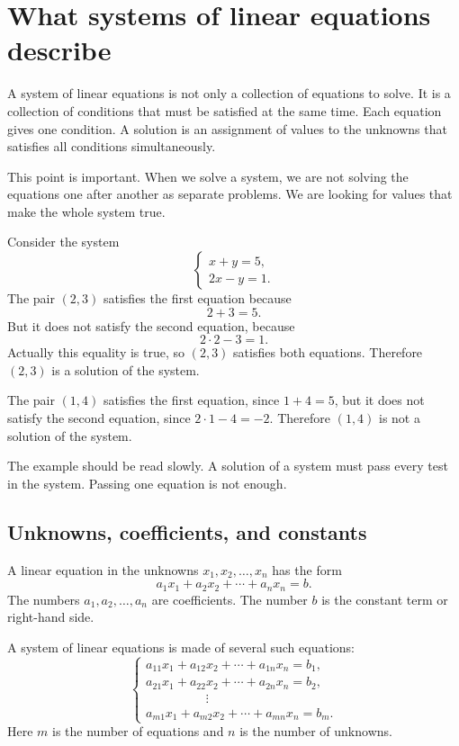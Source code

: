 \section{What systems of linear equations describe}

A system of linear equations is not only a collection of equations to solve. It is a collection of conditions that must be satisfied at the same time. Each equation gives one condition. A solution is an assignment of values to the unknowns that satisfies all conditions simultaneously.

This point is important. When we solve a system, we are not solving the equations one after another as separate problems. We are looking for values that make the whole system true.

\begin{examplebox}
Consider the system
\[
\begin{cases}
x+y=5,\\
2x-y=1.
\end{cases}
\]
The pair \((2,3)\) satisfies the first equation because
\[
2+3=5.
\]
But it does not satisfy the second equation, because
\[
2\cdot2-3=1.
\]
Actually this equality is true, so \((2,3)\) satisfies both equations. Therefore \((2,3)\) is a solution of the system.

The pair \((1,4)\) satisfies the first equation, since \(1+4=5\), but it does not satisfy the second equation, since \(2\cdot1-4=-2\). Therefore \((1,4)\) is not a solution of the system.
\end{examplebox}

The example should be read slowly. A solution of a system must pass every test in the system. Passing one equation is not enough.

\subsection*{Unknowns, coefficients, and constants}

A linear equation in the unknowns \(x_1,x_2,\ldots,x_n\) has the form
\[
a_1x_1+a_2x_2+\cdots+a_nx_n=b.
\]
The numbers \(a_1,a_2,\ldots,a_n\) are coefficients. The number \(b\) is the constant term or right-hand side.

A system of linear equations is made of several such equations:
\[
\begin{cases}
a_{11}x_1+a_{12}x_2+\cdots+a_{1n}x_n=b_1,\\
a_{21}x_1+a_{22}x_2+\cdots+a_{2n}x_n=b_2,\\
\hspace{2cm}\vdots\\
a_{m1}x_1+a_{m2}x_2+\cdots+a_{mn}x_n=b_m.
\end{cases}
\]
Here \(m\) is the number of equations and \(n\) is the number of unknowns.

